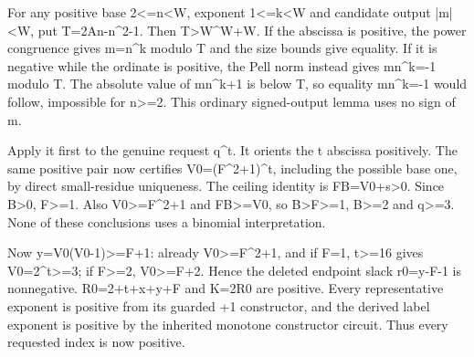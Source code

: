 For any positive base 2\textless{}\allowbreak{}=\allowbreak{}n\textless{}\allowbreak{}W, exponent 1\textless{}\allowbreak{}=\allowbreak{}k\textless{}\allowbreak{}W and candidate output |m|\textless{}\allowbreak{}W, put T=\allowbreak{}2An-n\textasciicircum{}\allowbreak{}2-1. Then T\textgreater{}\allowbreak{}W\textasciicircum{}\allowbreak{}W+\allowbreak{}W. If the abscissa is positive, the power congruence gives m=\allowbreak{}n\textasciicircum{}\allowbreak{}k modulo T and the size bounds give equality. If it is negative while the ordinate is positive, the Pell norm instead gives m\textasteriskcentered{}\allowbreak{}n\textasciicircum{}\allowbreak{}k=\allowbreak{}-1 modulo T. The absolute value of m\textasteriskcentered{}\allowbreak{}n\textasciicircum{}\allowbreak{}k+\allowbreak{}1 is below T, so equality m\textasteriskcentered{}\allowbreak{}n\textasciicircum{}\allowbreak{}k=\allowbreak{}-1 would follow, impossible for n\textgreater{}\allowbreak{}=\allowbreak{}2. This ordinary signed-output lemma uses no sign of m.



Apply it first to the genuine request q\textasciicircum{}\allowbreak{}t. It orients the t abscissa positively. The same positive pair now certifies V0=\allowbreak{}(F\textasciicircum{}\allowbreak{}2+\allowbreak{}1)\textasciicircum{}\allowbreak{}t, including the possible base one, by direct small-residue uniqueness. The ceiling identity is FB=\allowbreak{}V0+\allowbreak{}s\textgreater{}\allowbreak{}0. Since B\textgreater{}\allowbreak{}0, F\textgreater{}\allowbreak{}=\allowbreak{}1. Also V0\textgreater{}\allowbreak{}=\allowbreak{}F\textasciicircum{}\allowbreak{}2+\allowbreak{}1 and FB\textgreater{}\allowbreak{}=\allowbreak{}V0, so B\textgreater{}\allowbreak{}F\textgreater{}\allowbreak{}=\allowbreak{}1, B\textgreater{}\allowbreak{}=\allowbreak{}2 and q\textgreater{}\allowbreak{}=\allowbreak{}3. None of these conclusions uses a binomial interpretation.



Now y=\allowbreak{}V0(V0-1)\textgreater{}\allowbreak{}=\allowbreak{}F+\allowbreak{}1: already V0\textgreater{}\allowbreak{}=\allowbreak{}F\textasciicircum{}\allowbreak{}2+\allowbreak{}1, and if F=\allowbreak{}1, t\textgreater{}\allowbreak{}=\allowbreak{}16 gives V0=\allowbreak{}2\textasciicircum{}\allowbreak{}t\textgreater{}\allowbreak{}=\allowbreak{}3; if F\textgreater{}\allowbreak{}=\allowbreak{}2, V0\textgreater{}\allowbreak{}=\allowbreak{}F+\allowbreak{}2. Hence the deleted endpoint slack r0=\allowbreak{}y-F-1 is nonnegative. R0=\allowbreak{}2+\allowbreak{}t+\allowbreak{}x+\allowbreak{}y+\allowbreak{}F and K=\allowbreak{}2R0 are positive. Every representative exponent is positive from its guarded +\allowbreak{}1 constructor, and the derived label exponent is positive by the inherited monotone constructor circuit. Thus every requested index is now positive.



